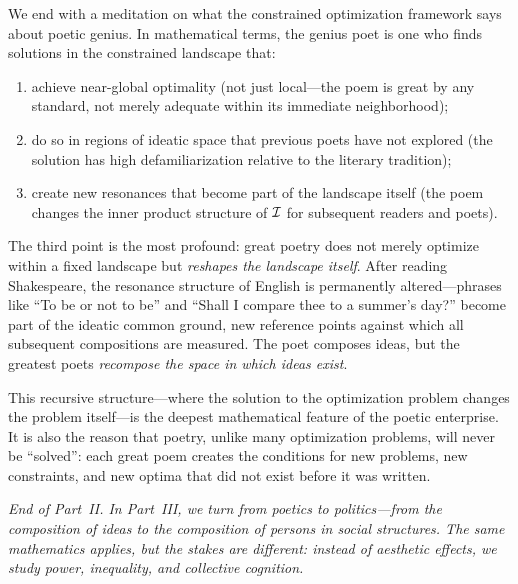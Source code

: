 \begin{interpretation}
\label{interp:final-poetics}
We end with a meditation on what the constrained optimization framework says
about poetic genius.  In mathematical terms, the genius poet is one who finds
solutions in the constrained landscape that:

\begin{enumerate}
  \item achieve near-global optimality (not just local---the poem is great
    by any standard, not merely adequate within its immediate neighborhood);
  \item do so in regions of ideatic space that previous poets have not explored
    (the solution has high defamiliarization relative to the literary tradition);
  \item create new resonances that become part of the landscape itself
    (the poem changes the inner product structure of $\mathcal{I}$ for subsequent
    readers and poets).
\end{enumerate}

The third point is the most profound: great poetry does not merely optimize
within a fixed landscape but \emph{reshapes the landscape itself}.  After
reading Shakespeare, the resonance structure of English is permanently altered---phrases
like ``To be or not to be'' and ``Shall I compare thee to a summer's day?''
become part of the ideatic common ground, new reference points against which
all subsequent compositions are measured.  The poet composes ideas, but the
greatest poets \emph{recompose the space in which ideas exist}.

This recursive structure---where the solution to the optimization problem
changes the problem itself---is the deepest mathematical feature of the
poetic enterprise.  It is also the reason that poetry, unlike many optimization
problems, will never be ``solved'': each great poem creates the conditions
for new problems, new constraints, and new optima that did not exist before
it was written.

\medskip

\noindent\emph{End of Part~II.  In Part~III, we turn from poetics to
politics---from the composition of ideas to the composition of persons in
social structures.  The same mathematics applies, but the stakes are different:
instead of aesthetic effects, we study power, inequality, and collective
cognition.}
\end{interpretation}

